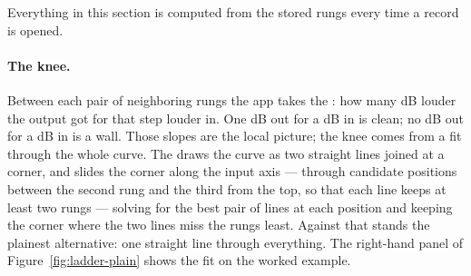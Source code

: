 \documentclass[11pt,a4paper]{article}
\begin{document}
Everything in this section is computed from the stored rungs every time a
record is opened.

\paragraph{The knee.} Between each pair of neighboring rungs the app
takes the : how many dB louder the output got for
that step louder in. One dB out for a dB in is clean; no dB out for a dB
in is a wall. Those slopes are
the local picture; the knee comes from a fit through the whole curve. The
 draws the curve as two straight lines joined at a
corner, and slides the corner along the input axis --- through
\cmpCandidates{} candidate positions between the second rung and the
third from the top, so that each line keeps at least two rungs --- solving
for the best pair of lines at each position and keeping the corner where
the two lines miss the rungs least. Against that stands the plainest
alternative: one straight line through everything. The right-hand panel
of Figure~\ref{fig:ladder-plain} shows the fit on the worked example.
\end{document}
